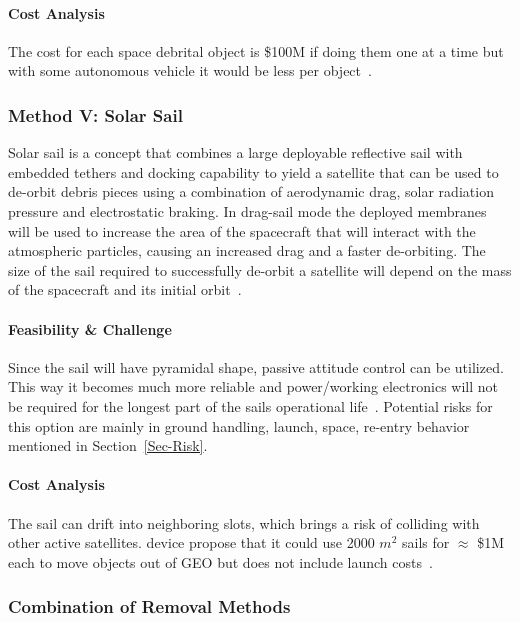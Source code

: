 \documentclass{mcmthesis}
\begin{document}
	\paragraph{Cost Analysis}
	
	The cost for each space debrital object is \$100M if doing them one at a time but with some autonomous vehicle it would be less per object~\cite{McKnight}.
	
	\subsubsection{Method V: Solar Sail}
	
	Solar sail is a concept that combines a large deployable reflective sail with embedded tethers and
	docking capability to yield a satellite that can be used to de-orbit debris pieces using a combination
	of aerodynamic drag, solar radiation pressure and electrostatic braking. In drag-sail mode the deployed membranes will be used to increase the area of the spacecraft that will interact with the atmospheric particles, causing an increased drag and a faster de-orbiting. The size of the sail required to successfully de-orbit a satellite will depend on the mass of the spacecraft and its initial orbit~\cite{Visagie}.
	
	\paragraph{Feasibility \& Challenge}
	
	Since the sail will have pyramidal shape, passive attitude control can be utilized. This way it
	becomes much more reliable and power/working electronics will not be required for the longest
	part of the sails operational life~\cite{Visagie}. Potential risks for this option are mainly in ground handling, launch, space, re-entry behavior mentioned in Section~\ref{Sec-Risk}.
	
	
	\paragraph{Cost Analysis}
	
	The sail can drift into neighboring slots, which brings a risk of colliding with other active
	satellites. device propose that it could use 2000 $m^2$ sails for $\approx$ \$1M each to move objects out of GEO but does not include launch costs~\cite{McKnight}.
	
	
	\subsubsection{Combination of Removal Methods}
	
\end{document}
